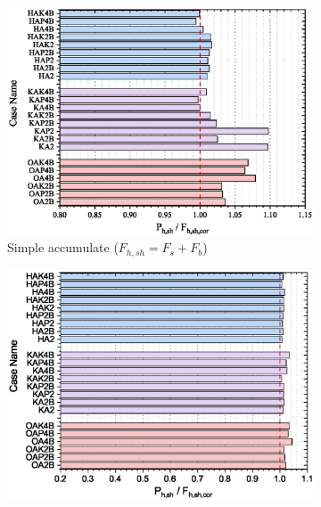 \begin{figure}
    \centering
    \begin{subfigure}[b]{0.45\textwidth}
        \includegraphics[width=\linewidth]{imgs/ch7/RF-total-cor.eps}
        \caption{Simple accumulate ($F_{h,sh}=F_s+F_b$)}
        \label{fig-fhv}
    \end{subfigure}
    \hfill
    \begin{subfigure}[b]{0.45\textwidth}
        \includegraphics[width=\linewidth]{imgs/ch7/RF-total-cor-2.eps}

\end{subfigure}
\end{figure}

